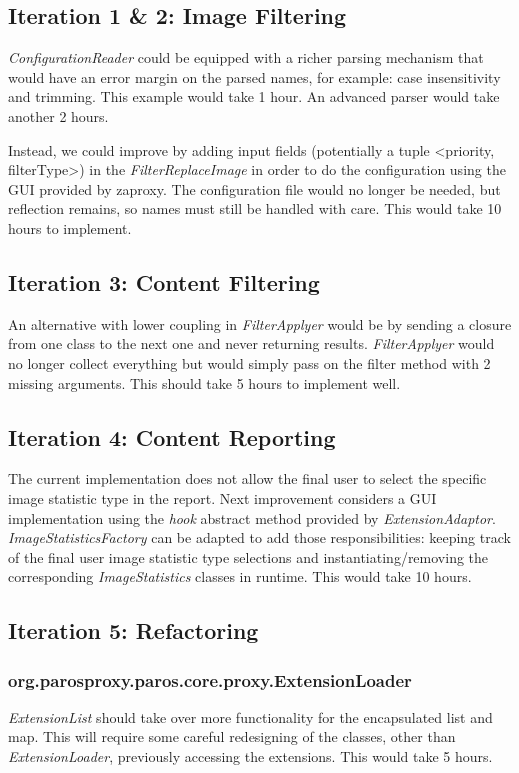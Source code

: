 \subsection{Iteration 1 \& 2: Image Filtering}


\textit{ConfigurationReader} could be equipped with a richer parsing mechanism that would have an error margin on the parsed names, for example: case insensitivity and trimming. This example would take 1 hour. An advanced parser would take another 2 hours.
\par
Instead, we could improve by adding input fields (potentially a tuple <priority, filterType>) in the \textit{FilterReplaceImage} in order to do the configuration using the GUI provided by zaproxy. The configuration file would no longer be needed, but reflection remains, so names must still be handled with care. This would take 10 hours to implement.
\subsection{Iteration 3: Content Filtering}
An alternative with lower coupling in \textit{FilterApplyer} would be by sending a closure from one class to the next one and never returning results. \textit{FilterApplyer} would no longer collect everything but would simply pass on the filter method with 2 missing arguments. This should take 5 hours to implement well.
\subsection{Iteration 4: Content Reporting}
The current implementation does not allow the final user to select the specific image statistic type in the report. Next improvement considers a GUI implementation using the \textit{hook} abstract method provided by \textit{ExtensionAdaptor}. \textit{ImageStatisticsFactory} can be adapted to add those responsibilities: keeping track of the final user image statistic type selections and instantiating/removing the corresponding \textit{ImageStatistics} classes in runtime. This would take 10 hours.

\subsection{Iteration 5: Refactoring}
\subsubsection{org.parosproxy.paros.core.proxy.ExtensionLoader}
\textit{ExtensionList} should take over more functionality for the encapsulated list and map. This will require some careful redesigning of the classes, other than \textit{ExtensionLoader}, previously accessing the extensions. This would take 5 hours.
